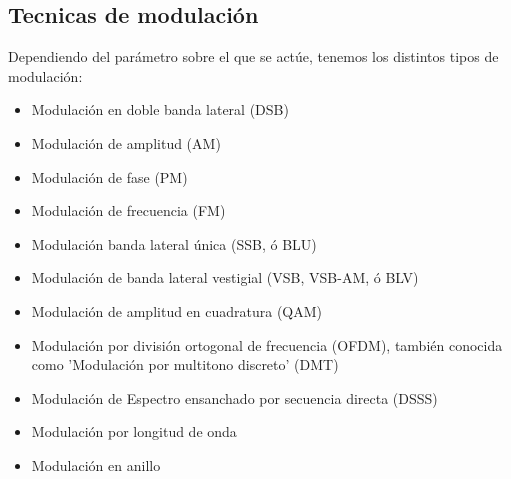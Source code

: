 \documentclass[a4paper]{article}
\begin{document}
\noindent{}

\subsection{Tecnicas de modulación}

Dependiendo del parámetro sobre el que se actúe, tenemos los distintos tipos de modulación:

\begin{itemize}
	\item Modulación en doble banda lateral (DSB)
	\item Modulación de amplitud (AM)
	\item Modulación de fase (PM)
	\item Modulación de frecuencia (FM)
	\item Modulación banda lateral única (SSB, ó BLU)
	\item Modulación de banda lateral vestigial (VSB, VSB-AM, ó BLV)
	\item Modulación de amplitud en cuadratura (QAM)
	\item Modulación por división ortogonal de frecuencia (OFDM), también conocida como 'Modulación por multitono discreto' (DMT)
	\item Modulación de Espectro ensanchado por secuencia directa (DSSS)
	\item Modulación por longitud de onda
	\item Modulación en anillo
\end{itemize}
\end{document}
